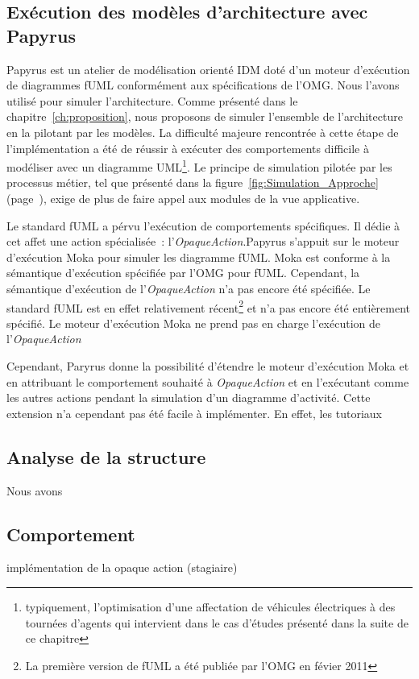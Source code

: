     \subsection{Exécution des modèles d’architecture avec Papyrus}

    Papyrus est un atelier de modélisation orienté IDM doté d'un moteur d'exécution de diagrammes fUML conformément aux spécifications de l'OMG.
    Nous l'avons utilisé pour simuler l'architecture. Comme présenté dans le chapitre~\ref{ch:proposition}, nous proposons de simuler
    l'ensemble de l'architecture en la pilotant par les modèles. 
    La difficulté majeure rencontrée à cette étape de l'implémentation a été de réussir à exécuter des comportements difficile à modéliser avec un diagramme UML\footnote{typiquement, l'optimisation d'une affectation de véhicules électriques à des tournées d'agents qui intervient dans le cas d'études présenté dans la suite de ce chapitre}. Le principe de simulation pilotée par les processus métier, tel que présenté dans la figure~\ref{fig:Simulation_Approche} (page~\pageref{fig:Simulation_Approche}), exige de plus de faire appel aux modules de la vue applicative. 
    
    Le standard fUML a pérvu l'exécution de comportements spécifiques. Il dédie à cet affet une action spécialisée~: l'\emph{OpaqueAction}.Papyrus s'appuit sur le moteur d'exécution Moka pour simuler les diagramme fUML. Moka est conforme à la sémantique d'exécution spécifiée par l'OMG pour fUML. Cependant, la sémantique d'exécution de l'\emph{OpaqueAction} n'a pas encore été spécifiée. Le standard fUML est en effet relativement récent\footnote{La première version de fUML a été publiée par l'OMG en févier 2011} et n'a pas encore été entièrement spécifié. Le moteur d'exécution Moka ne prend pas en charge l'exécution de l'\emph{OpaqueAction}

    Cependant, Paryrus donne la possibilité d'étendre le moteur d'exécution Moka et en attribuant le comportement souhaité à \emph{OpaqueAction} et en l'exécutant comme les autres actions pendant la simulation d'un diagramme d'activité. Cette extension n'a cependant pas été facile à implémenter. En effet, les tutoriaux 




    \subsection{Analyse de la structure}
    Nous avons 
    \subsection{Comportement}
    implémentation de la opaque action
    (stagiaire)

